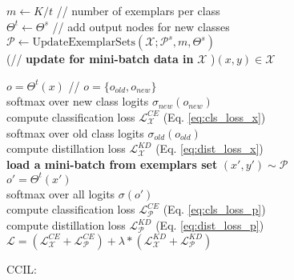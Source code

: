 \documentclass[final]{cvpr}
\begin{document}
\begin{algorithm}[!b]
\SetAlgoLined
\DontPrintSemicolon
\Indentp{0.5em}
\Indm
{}
\Indp
$\textit{m} \gets K/t$ \hspace{0.2cm} // number of exemplars per class\\
$\Theta^t \gets \Theta^s$  \hspace{0.2cm} // add output nodes for new classes \\
$\mathcal{P} \gets \text{UpdateExemplarSets}(\mathcal{X}; \mathcal{P}^s, m, \Theta^s)$  \label{alg1:new_exem} \\


\For(\hspace{100px}// {\textbf{update for mini-batch data in} $\mathcal{X}$} ){$(x,y)\in \mathcal{X}$}{  \label{alg1:intra_task_start}

$o = \Theta^t(x)$  \hspace{1cm}  // $o=\{o_{old}, o_{new}\}$\\   
softmax over new class logits $ \sigma_{new}(o_{new})$  \\
compute classification loss $\mathcal{L}^{CE}_{\mathcal{X}}$ (Eq. \ref{eq:cls_loss_x}) \\
softmax over old class logits $\sigma_{old}(o_{old})$  \\
compute distillation loss $\mathcal{L}_\mathcal{X}^{KD}$  (Eq. \ref{eq:dist_loss_x})\\
 \label{alg1:intra_task_end}
\BlankLine
 \textbf{load a mini-batch from exemplars set} $(x',y')\sim \mathcal{P}$  \label{alg1:inter_task_start} \\
$o' = \Theta^t(x')$    \\
softmax over all logits $\sigma(o')$  \label{alg1:comb_sigma}  \\
compute classification loss $\mathcal{L}^{CE}_{\mathcal{P}}$ (Eq. \ref{eq:cls_loss_p}) \\
compute distillation loss $\mathcal{L}^{KD}_{\mathcal{P}}$ (Eq. \ref{eq:dist_loss_p}) \\
\BlankLine
$\mathcal{L} = (\mathcal{L}^{CE}_{\mathcal{X}} + \mathcal{L}^{CE}_{\mathcal{P}}) + \lambda*(\mathcal{L}^{KD}_{\mathcal{X}} + \mathcal{L}^{KD}_{\mathcal{P}})$ \label{alg1:final_loss}
}
\caption{CCIL: } \label{alg1}
\end{algorithm}
\end{document}
